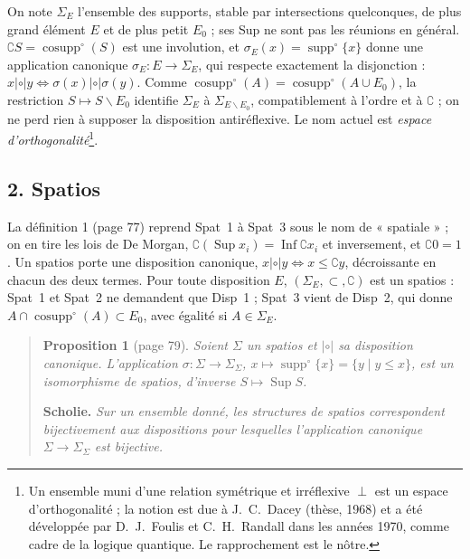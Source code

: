 \documentclass[11pt,a4paper]{article}
\begin{document}
On note $\Sigma_{E}$ l'ensemble des supports, stable par intersections
quelconques, de plus grand élément $E$ et de plus petit $E_{0}$ ; ses Sup ne sont
pas les réunions en général. $\complement S = \operatorname{cosupp}^{\circ}(S)$
est une involution, et $\sigma_{E}(x) = \operatorname{supp}^{\circ}\{x\}$ donne
une application canonique $\sigma_{E} : E \to \Sigma_{E}$, qui respecte
exactement la disjonction : $x \mathrel{|\circ|} y \iff \sigma(x)
\mathrel{|\circ|} \sigma(y)$. Comme $\operatorname{cosupp}^{\circ}(A) =
\operatorname{cosupp}^{\circ}(A \cup E_{0})$, la restriction $S \mapsto S
\smallsetminus E_{0}$ identifie $\Sigma_{E}$ à $\Sigma_{E \smallsetminus E_{0}}$,
compatiblement à l'ordre et à $\complement$ ; on ne perd rien à supposer la
disposition antiréflexive. Le nom actuel est \emph{espace
d'orthogonalité}\footnote{Un ensemble muni d'une relation symétrique et
irréflexive $\perp$ est un espace d'orthogonalité ; la notion est due à
J.~C.~Dacey (thèse, 1968) et a été développée par D.~J.~Foulis et C.~H.~Randall
dans les années 1970, comme cadre de la logique quantique. Le rapprochement est le
nôtre.}.

\subsection*{2. Spatios}

La définition 1 (page 77) reprend Spat~1 à Spat~3 sous le nom de « spatiale » ;
on en tire les lois de De Morgan, $\complement(\operatorname{Sup} x_{i}) =
\operatorname{Inf}\complement x_{i}$ et inversement, et $\complement 0 = 1$. Un
spatios porte une disposition canonique, $x \mathrel{|\circ|} y \iff x \leq
\complement y$, décroissante en chacun des deux termes. Pour toute disposition
$E$, $(\Sigma_{E}, \subset, \complement)$ est un spatios : Spat~1 et Spat~2 ne
demandent que Disp~1 ; Spat~3 vient de Disp~2, qui donne $A \cap
\operatorname{cosupp}^{\circ}(A) \subset E_{0}$, avec égalité si $A \in
\Sigma_{E}$.

\begin{quote}
\textbf{Proposition 1} (page 79). \emph{Soient $\Sigma$ un spatios et
$\mathrel{|\circ|}$ sa disposition canonique. L'application $\sigma : \Sigma \to
\Sigma_{\Sigma}$, $x \mapsto \operatorname{supp}^{\circ}\{x\} = \{y \mid y \leq
x\}$, est un isomorphisme de spatios, d'inverse $S \mapsto \operatorname{Sup}S$.}

\textbf{Scholie.} \emph{Sur un ensemble donné, les structures de spatios
correspondent bijectivement aux dispositions pour lesquelles l'application
canonique $\Sigma \to \Sigma_{\Sigma}$ est bijective.}
\end{quote}
\end{document}
